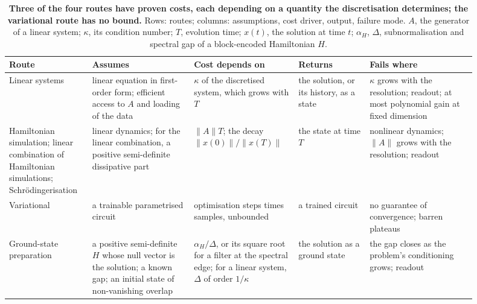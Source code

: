 \begin{table}[!htbp]
    \centering
    \caption[Quantum routes to differential equations and what their costs depend on]{\textbf{Three of the four routes have proven costs, each depending on a quantity the discretisation determines; the variational route has no bound.} Rows: routes; columns: assumptions, cost driver, output, failure mode. $A$, the generator of a linear system; $\kappa$, its condition number; $T$, evolution time; $x(t)$, the solution at time $t$; $\alpha_H$, $\Delta$, subnormalisation and spectral gap of a block-encoded Hamiltonian $H$.}
    \label{tab:de-approaches}
    \footnotesize
    \begin{tabular}{@{}p{0.16\linewidth}p{0.20\linewidth}p{0.19\linewidth}p{0.14\linewidth}p{0.21\linewidth}@{}}
        \toprule
        Route & Assumes & Cost depends on & Returns & Fails where \\
        \midrule
        Linear systems \cite{harrow2009hhl,berry2017linearode,childsliu2020spectral,costa2022optimal,jennings2023cost} & linear equation in first-order form; efficient access to $A$ and loading of the data & $\kappa$ of the discretised system, which grows with $T$ & the solution, or its history, as a state & $\kappa$ grows with the resolution; readout; at most polynomial gain at fixed dimension \\
        \addlinespace
        Hamiltonian simulation; linear combination of Hamiltonian simulations; Schrödingerisation \cite{lowchuang2019qubitization,anliulin2023lchs,jinliuyu2023schrodingerisation} & linear dynamics; for the linear combination, a positive semi-definite dissipative part & $\|A\|T$; the decay $\|x(0)\|/\|x(T)\|$ & the state at time $T$ & nonlinear dynamics; $\|A\|$ grows with the resolution; readout \\
        \addlinespace
        Variational \cite{lubasch2020variational,kyriienko2021differentiable,bravoprieto2023vqls,pool2024nonlinear} & a trainable parametrised circuit & optimisation steps times samples, unbounded & a trained circuit & no guarantee of convergence; barren plateaus \\
        \addlinespace
        Ground-state preparation \cite{subasi2019adiabatic,anlin2022timeoptimal,costa2022optimal,lintong2020filtering} & a positive semi-definite $H$ whose null vector is the solution; a known gap; an initial state of non-vanishing overlap & $\alpha_H/\Delta$, or its square root for a filter at the spectral edge; for a linear system, $\Delta$ of order $1/\kappa$ & the solution as a ground state & the gap closes as the problem's conditioning grows; readout \\
        \bottomrule
    \end{tabular}
\end{table}

